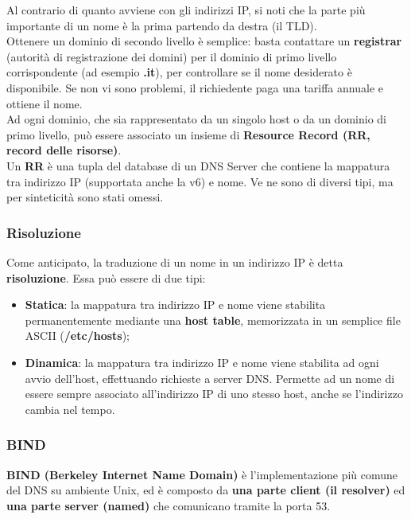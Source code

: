             Al contrario di quanto avviene con gli indirizzi IP, si noti che la parte più importante di un nome
            è la prima partendo da destra (il TLD).\\

            Ottenere un dominio di secondo livello è semplice: basta contattare un \textbf{registrar} (autorità di
            registrazione dei domini) per il dominio di primo livello corrispondente (ad esempio \textbf{.it}), per
            controllare se il nome desiderato è disponibile. Se non vi sono problemi, il richiedente paga una
            tariffa annuale e ottiene il nome.\\

            Ad ogni dominio, che sia rappresentato da un singolo host o da un dominio di primo livello, può
            essere associato un insieme di \textbf{Resource Record (RR, record delle risorse)}.\\

            Un \textbf{RR} è una tupla del database di un DNS Server che contiene la mappatura tra indirizzo IP
            (supportata anche la v6) e nome. Ve ne sono di diversi tipi, ma per sinteticità sono stati omessi.

        \subsubsection{Risoluzione}
            Come anticipato, la traduzione di un nome in un indirizzo IP è detta \textbf{risoluzione}. Essa può
            essere di due tipi:
            
            \begin{itemize}
                \item \textbf{Statica}: la mappatura tra indirizzo IP e nome viene stabilita permanentemente
                mediante una \textbf{host table}, memorizzata in un semplice file ASCII (\textbf{/etc/hosts});
                \item \textbf{Dinamica}: la mappatura tra indirizzo IP e nome viene stabilita ad ogni avvio dell’host,
                effettuando richieste a server DNS. Permette ad un nome di essere sempre associato
                all’indirizzo IP di uno stesso host, anche se l’indirizzo cambia nel tempo.
            \end{itemize}

        \subsubsection{BIND}
            \textbf{BIND (Berkeley Internet Name Domain)} è l’implementazione più comune del DNS su
            ambiente Unix, ed è composto da \textbf{una parte client (il resolver)} ed \textbf{una parte server (named)}
            che comunicano tramite la porta 53.\\

